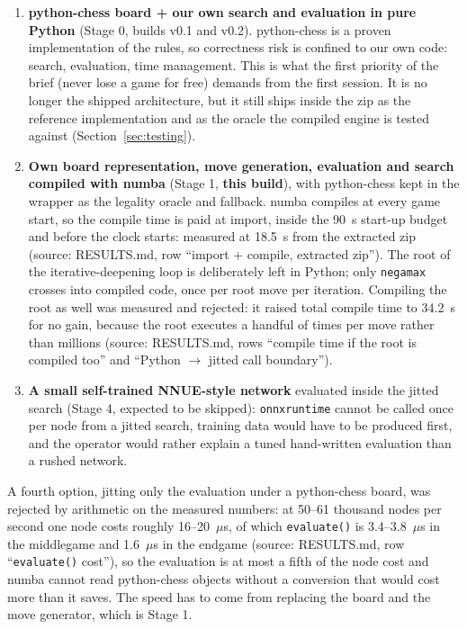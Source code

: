 \documentclass[11pt,a4paper]{article}
\newcommand{\src}[1]{{\small(source: #1)}}
\newcommand{\code}[1]{\texttt{#1}}
\begin{document}
\begin{enumerate}[nosep]
  \item \textbf{python-chess board + our own search and evaluation in pure Python} (Stage 0, builds
        v0.1 and v0.2). python-chess is a proven implementation of the rules, so correctness risk is
        confined to our own code: search, evaluation, time management. This is what the first priority
        of the brief (never lose a game for free) demands from the first session. It is no longer the
        shipped architecture, but it still ships inside the zip as the reference implementation and as
        the oracle the compiled engine is tested against (Section~\ref{sec:testing}).
  \item \textbf{Own board representation, move generation, evaluation and search compiled with numba}
        (Stage 1, \textbf{this build}), with python-chess kept in the wrapper as the legality oracle and
        fallback. numba compiles at every game start, so the compile time is paid at import, inside the
        90~s start-up budget and before the clock starts: measured at 18.5~s from the extracted zip
        \src{RESULTS.md, row ``import + compile, extracted zip''}. The root of the iterative-deepening
        loop is deliberately left in Python; only \code{negamax} crosses into compiled code, once per
        root move per iteration. Compiling the root as well was measured and rejected: it raised total
        compile time to 34.2~s for no gain, because the root executes a handful of times per move rather
        than millions \src{RESULTS.md, rows ``compile time if the root is compiled too'' and ``Python
        $\rightarrow$ jitted call boundary''}.
  \item \textbf{A small self-trained NNUE-style network} evaluated inside the jitted search (Stage 4,
        expected to be skipped): \code{onnxruntime} cannot be called once per node from a jitted search,
        training data would have to be produced first, and the operator would rather explain a tuned
        hand-written evaluation than a rushed network.
\end{enumerate}

A fourth option, jitting only the evaluation under a python-chess board, was rejected by arithmetic on the
measured numbers: at 50--61 thousand nodes per second one node costs roughly 16--20~$\mu$s, of which
\code{evaluate()} is 3.4--3.8~$\mu$s in the middlegame and 1.6~$\mu$s in the endgame \src{RESULTS.md, row
``\code{evaluate()} cost''}, so the evaluation is at most a fifth of the node cost and numba cannot read
python-chess objects without a conversion that would cost more than it saves. The speed has to come from
replacing the board and the move generator, which is Stage 1.
\end{document}
